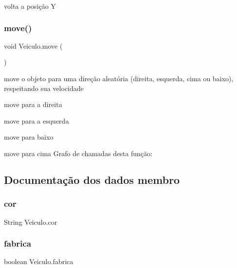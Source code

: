 volta a posição Y 

\mbox{\label{class_veiculo_a3341b0ed6b4d34db990a31f7a499ae80}} 
\subsubsection{\texorpdfstring{move()}{move()}}
{\footnotesize\ttfamily void Veiculo.\+move (\begin{DoxyParamCaption}{ }\end{DoxyParamCaption})}



move o objeto para uma direção aleatória (direita, esquerda, cima ou baixo), respeitando sua velocidade 

move para a direita

move para a esquerda

move para baixo

move para cima Grafo de chamadas desta função\+:


\subsection{Documentação dos dados membro}
\mbox{\label{class_veiculo_a6bc5886e61340672e69bd638936ec1d5}} 
\subsubsection{\texorpdfstring{cor}{cor}}
{\footnotesize\ttfamily String Veiculo.\+cor\hspace{0.3cm}{\ttfamily [protected]}}

\mbox{\label{class_veiculo_a23d377a69bdf558ebedb5bc35dcdebf5}} 
\subsubsection{\texorpdfstring{fabrica}{fabrica}}
{\footnotesize\ttfamily boolean Veiculo.\+fabrica\hspace{0.3cm}{\ttfamily [protected]}}

\mbox{\label{class_veiculo_a069917a284297fe5b385258b2afd9ad6}} 
